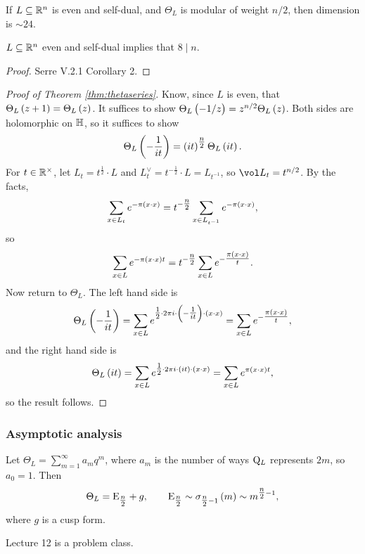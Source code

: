 If $ L \subseteq \mathbb{R}^n $ is even and self-dual, and $ \Theta_L $ is modular of weight $ n / 2 $, then dimension is $ \sim 24 $.

\begin{fact*}
$ L \subseteq \mathbb{R}^n $ even and self-dual implies that $ 8 \mid n $.
\end{fact*}

\begin{proof}
Serre V.2.1 Corollary 2.
\end{proof}

\pagebreak

\begin{proof}[Proof of Theorem \ref{thm:thetaseries}]
Know, since $ L $ is even, that $ \Theta_L\br{z + 1} = \Theta_L\br{z} $. It suffices to show $ \Theta_L\br{-1 / z} = z^{n / 2}\Theta_L\br{z} $. Both sides are holomorphic on $ \mathbb{H} $, so it suffices to show
$$ \Theta_L\br{-\dfrac{1}{it}} = \br{it}^{\tfrac{n}{2}}\Theta_L\br{it}. $$
For $ t \in \mathbb{R}^\times $, let $ L_t = t^{\tfrac{1}{2}} \cdot L $ and $ L_t^\vee = t^{-\tfrac{1}{2}} \cdot L = L_{t^{-1}} $, so $ \vol L_t = t^{n / 2} $. By the facts,
$$ \sum_{x \in L_t} e^{-\pi\br{x \cdot x}} = t^{-\tfrac{n}{2}}\sum_{x \in L_{t^{-1}}} e^{-\pi\br{x \cdot x}}, $$
so
$$ \sum_{x \in L} e^{-\pi\br{x \cdot x}t} = t^{-\tfrac{n}{2}}\sum_{x \in L} e^{-\tfrac{\pi\br{x \cdot x}}{t}}. $$
Now return to $ \Theta_L $. The left hand side is
$$ \Theta_L\br{-\dfrac{1}{it}} = \sum_{x \in L} e^{\tfrac{1}{2} \cdot 2\pi i \cdot \br{-\tfrac{1}{it}} \cdot \br{x \cdot x}} = \sum_{x \in L} e^{-\tfrac{\pi\br{x \cdot x}}{t}}, $$
and the right hand side is
$$ \Theta_L\br{it} = \sum_{x \in L} e^{\tfrac{1}{2} \cdot 2\pi i \cdot \br{it} \cdot \br{x \cdot x}} = \sum_{x \in L} e^{\pi\br{x \cdot x}t}, $$
so the result follows.
\end{proof}

\subsubsection{Asymptotic analysis}

Let $ \Theta_L = \sum_{m = 1}^\infty a_mq^m $, where $ a_m $ is the number of ways $ \mathrm{Q}_L $ represents $ 2m $, so $ a_0 = 1 $. Then
$$ \Theta_L = \E_{\tfrac{n}{2}} + g, \qquad \E_{\tfrac{n}{2}} \sim \sigma_{\tfrac{n}{2} - 1}\br{m} \sim m^{\tfrac{n}{2} - 1}, $$
where $ g $ is a cusp form.


Lecture 12 is a problem class.

